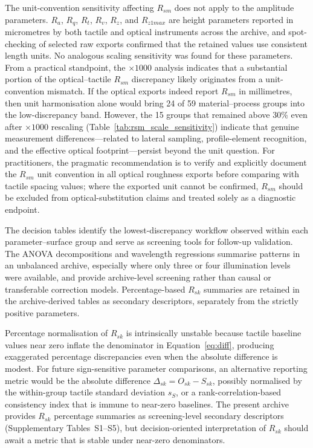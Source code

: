 \documentclass{article}
\begin{document}
The unit-convention sensitivity affecting $R_{sm}$ does not apply to the amplitude parameters. $R_a$, $R_q$, $R_t$, $R_v$, $R_z$, and $R_{z1max}$ are height parameters reported in micrometres by both tactile and optical instruments across the archive, and spot-checking of selected raw exports confirmed that the retained values use consistent length units. No analogous scaling sensitivity was found for these parameters. From a practical standpoint, the $\times 1000$ analysis indicates that a substantial portion of the optical--tactile $R_{sm}$ discrepancy likely originates from a unit-convention mismatch. If the optical exports indeed report $R_{sm}$ in millimetres, then unit harmonisation alone would bring 24 of 59 material--process groups into the low-discrepancy band. However, the 15 groups that remained above 30\% even after $\times 1000$ rescaling (Table~\ref{tab:rsm_scale_sensitivity}) indicate that genuine measurement differences---related to lateral sampling, profile-element recognition, and the effective optical footprint---persist beyond the unit question. For practitioners, the pragmatic recommendation is to verify and explicitly document the $R_{sm}$ unit convention in all optical roughness exports before comparing with tactile spacing values; where the exported unit cannot be confirmed, $R_{sm}$ should be excluded from optical-substitution claims and treated solely as a diagnostic endpoint.

The decision tables identify the lowest-discrepancy workflow observed within each parameter--surface group and serve as screening tools for follow-up validation. The ANOVA decompositions and wavelength regressions summarise patterns in an unbalanced archive, especially where only three or four illumination levels were available, and provide archive-level screening rather than causal or transferable correction models. Percentage-based $R_{sk}$ summaries are retained in the archive-derived tables as secondary descriptors, separately from the strictly positive parameters.

Percentage normalisation of $R_{sk}$ is intrinsically unstable because tactile baseline values near zero inflate the denominator in Equation~\ref{eq:diff}, producing exaggerated percentage discrepancies even when the absolute difference is modest. For future sign-sensitive parameter comparisons, an alternative reporting metric would be the absolute difference $\Delta_{sk}=O_{sk}-S_{sk}$, possibly normalised by the within-group tactile standard deviation $s_S$, or a rank-correlation-based consistency index that is immune to near-zero baselines. The present archive provides $R_{sk}$ percentage summaries as screening-level secondary descriptors (Supplementary Tables~S1--S5), but decision-oriented interpretation of $R_{sk}$ should await a metric that is stable under near-zero denominators.
\end{document}
